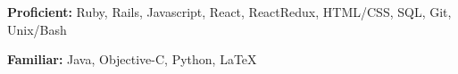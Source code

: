 

\begin{cvparagraph}

    {
      \begin{cvitems} %
        \vspace{5mm}
        \item \textbf{Proficient:} {Ruby, Rails, Javascript, React, ReactRedux, HTML/CSS, SQL, Git, Unix/Bash}
        \item \textbf{Familiar:} {Java, Objective-C, Python,} \LaTeX
      \end{cvitems}
    }
\vspace{5mm}
\end{cvparagraph}

